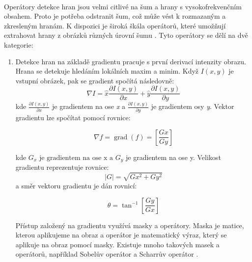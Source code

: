 \paragraph{} Operátory detekce hran jsou velmi citlivé na šum a hrany s vysokofrekvenčním obsahem. Proto je potřeba odstranit šum, což může vést k rozmazaným a zkresleným hranám. K dispozici je široká škála operátorů, které umožňují extrahovat hrany z obrázků různých úrovní šumu \cite{edge1}. Tyto operátory se dělí na dvě kategorie: 
\begin{enumerate}
    \item  Detekce hran na základě gradientu pracuje s první derivací intenzity obrazu. Hrana se detekuje hledáním lokálních maxim a minim. 
    Když \begin{math} I(x,y)\end{math} je vstupní obrázek, pak se gradient spočítá následovně:
    \begin{equation}
    \nabla I=\hat{x} \frac{\partial I(x, y)}{\partial x}+\hat{y} \frac{\partial I(x, y)}{\partial y}
    \end{equation}
    kde \begin{math}\frac{\partial I(x, y)}{\partial x}\end{math} je gradientem na ose \textit{x} a \begin{math}\frac{\partial I(x, y)}{\partial y}\end{math} je gradientem osy \textit{y}. 
    Vektor gradientu lze spočítat pomocí rovnice:
    
    \begin{equation}
    \nabla f=\operatorname{grad}(f)=\left[\frac{G x}{G y}\right]
    \end{equation}
    
    kde \begin{math}G_x \text{ je gradientem na ose x a } G_y\end{math} je gradientem na ose y. Velikost gradientu reprezentuje rovnice:
    \begin{equation}
    |G|=\sqrt{G x^2+G y^2}
    \end{equation}
    a směr vektoru gradientu je dán rovnicí:
    
    \begin{equation}
    \theta=\tan ^{-1}\left[\frac{G y}{G x}\right]
    \end{equation}
    
    Přístup založený na gradientu využívá masky a operátory. Maska je matice, kterou aplikujeme na obraz a operátor je matematický výraz, který se aplikuje na obraz pomocí masky. Existuje mnoho takových masek a operátorů, například Sobelův operátor a Scharrův operátor \cite{edge_types}.
    

\end{enumerate}
